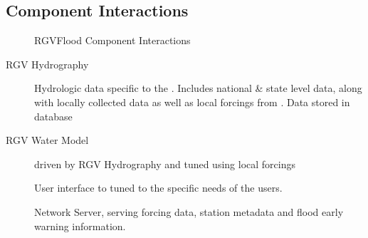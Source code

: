 \documentclass[letterpaper,12pt,english]{book}
\begin{document}
\subsection{Component Interactions}
\label{\detokenize{predevelopment/component-interactions/index:component-interactions}}\label{\detokenize{predevelopment/component-interactions/index::doc}}
\begin{figure}[htbp]
\centering
\capstart

\noindent{}
\caption{RGVFlood Component Interactions}\label{\detokenize{predevelopment/component-interactions/index:id1}}\end{figure}
\begin{description}
\item[{RGV Hydrography}] \leavevmode
\sphinxAtStartPar
Hydrologic data specific to the {\hyperref[\detokenize{glossary:term-LRGV}]{}}. Includes national \& state level data, along with locally collected data as well as local forcings from {\hyperref[\detokenize{glossary:term-RTHS.us}]{}}. Data stored in {\hyperref[\detokenize{glossary:term-REON}]{}} {\hyperref[\detokenize{glossary:term-PostgreSQL}]{}} database

\item[{RGV Water Model}] \leavevmode
\sphinxAtStartPar
{\hyperref[\detokenize{glossary:term-REON-WM}]{}} driven by RGV Hydrography and tuned using local forcings

\item[{{\hyperref[\detokenize{glossary:term-RGVFlood.com}]{}}}] \leavevmode
\sphinxAtStartPar
User interface to {\hyperref[\detokenize{glossary:term-REON.cc}]{}} tuned to the specific needs of the {\hyperref[\detokenize{glossary:term-LRGV}]{}} users.

\item[{{\hyperref[\detokenize{glossary:term-RTHS.us}]{}}}] \leavevmode
\sphinxAtStartPar
{\hyperref[\detokenize{glossary:term-RTHS}]{}} Network Server, serving forcing data, station metadata and flood early warning information.


\end{description}
\end{document}
